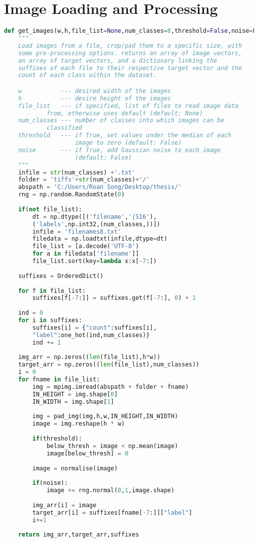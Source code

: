 \appendix
\chapter{Image Loading and Processing}
\begin{lstlisting}[language=Python, caption=Loading and Processing Images, captionpos=b, label={list:get_images}]
def get_images(w,h,file_list=None,num_classes=8,threshold=False,noise=False):
	"""
	Load images from a file, crop/pad them to a specific size, with 
	some pre-processing options. returns an array of image vectors, 
	an array of target vectors, and a dictionary linking the 
	suffixes of each file to their respective target vector and the 
	count of each class within the dataset.

	w           --- desired width of the images
	h           --- desire height of the images
	file_list   --- if specified, list of files to read image data 
			from, otherwise uses default (default: None)
	num_classes --- number of classes into which images can be 
			classified
	threshold   --- if True, set values under the median of each 
					image to zero (default: False)
	noise       --- if True, add Gaussian noise to each image 
					(default: False)
	"""
	infile = str(num_classes) +'.txt'
	folder = 'tiffs'+str(num_classes)+'/'
	abspath = 'C:/Users/Roan Song/Desktop/thesis/'
	rng = np.random.RandomState(0)
	
	if(not file_list):
		dt = np.dtype([('filename','|S16'),
		('labels',np.int32,(num_classes,))])
		infile = 'filenames8.txt'
		filedata = np.loadtxt(infile,dtype=dt)
		file_list = [a.decode('UTF-8') 
		for a in filedata['filename']]
		file_list.sort(key=lambda x:x[-7:])
	
	suffixes = OrderedDict()
	
	for f in file_list:
		suffixes[f[-7:]] = suffixes.get(f[-7:], 0) + 1
	
	ind = 0
	for i in suffixes:    
		suffixes[i] = {"count":suffixes[i],
		"label":one_hot(ind,num_classes)}
		ind += 1    
	
	img_arr = np.zeros((len(file_list),h*w))
	target_arr = np.zeros((len(file_list),num_classes))
	i = 0
	for fname in file_list:	
		img = mpimg.imread(abspath + folder + fname)
		IN_HEIGHT = img.shape[0]
		IN_WIDTH = img.shape[1]
		
		img = pad_img(img,h,w,IN_HEIGHT,IN_WIDTH)
		image = img.reshape(h * w)
		
		if(threshold):
			below_thresh = image < np.mean(image)
			image[below_thresh] = 0
		
		image = normalise(image)
		
		if(noise):
			image += rng.normal(0,1,image.shape)
		
		img_arr[i] = image  
		target_arr[i] = suffixes[fname[-7:]]["label"]		
		i+=1 
			
	return img_arr,target_arr,suffixes
\end{lstlisting}
